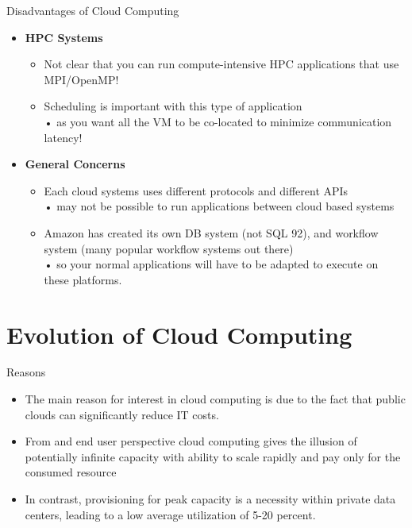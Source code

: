 \documentclass{SKP-beamer}
\begin{document}
\begin{frame}{Disadvantages of Cloud Computing}
	\begin{itemize}
		
		\item  \textbf{HPC Systems}
		\begin{itemize}
			\item  Not clear that you can run compute-intensive HPC applications that use MPI/OpenMP!
			\item  Scheduling is important with this type of application \\
			• as you want all the VM to be co-located to minimize communication latency!
			
		\end{itemize}
		\item  \textbf{General Concerns}
		\begin{itemize}
			\item  Each cloud systems uses different protocols and different APIs \\
			• may not be possible to run applications between cloud based systems
			\item  Amazon has created its own DB system (not SQL 92), and workflow system (many 
			popular workflow systems out there)\\
			• so your normal applications will have to be adapted to execute on these platforms.
			
			
		\end{itemize}
	\end{itemize}
\end{frame}


\section{\textbf{Evolution of Cloud Computing
}}
\begin{frame}{ Reasons}
	\begin{itemize}
		\item The main reason for interest in cloud computing is due to the fact that public clouds can significantly reduce IT costs.
		
		\item From and end user perspective cloud computing gives the illusion of potentially infinite capacity with ability to scale rapidly and pay only for the consumed resource
		\item In contrast, provisioning for peak capacity is a necessity within private data centers, leading to a low average utilization of 5-20 percent.	
	\end{itemize}
\end{frame}
\end{document}
